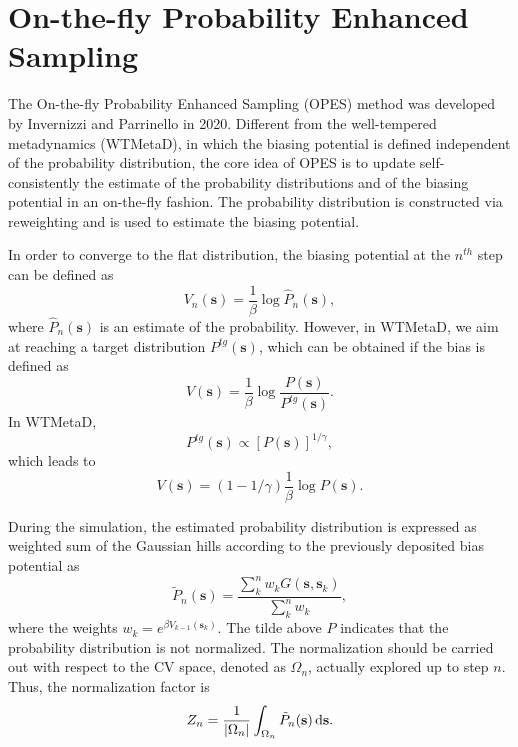 \section{On-the-fly Probability Enhanced Sampling\label{Sec:ES:OPES}}
The On-the-fly Probability Enhanced Sampling (OPES) method was developed by Invernizzi and Parrinello in 2020.\cite{InvernizziJPCL2020} Different from the well-tempered metadynamics (WTMetaD), in which the biasing potential is defined independent of the probability distribution, the core idea of OPES is to update self-consistently the estimate of the probability distributions and of the biasing potential in an on-the-fly fashion. The probability distribution is constructed via reweighting and is used to estimate the biasing potential.

In order to converge to the flat distribution, the biasing potential at the $n^{th}$ step can be defined as
\begin{equation}
	V_n(\mathbf{s})=\frac{1}{\beta} \log{\hat{P}_n(\mathbf{s})},
\end{equation}
where $\hat{P}_n(\mathbf{s})$ is an estimate of the probability. However, in WTMetaD, we aim at reaching a target distribution $P^{tg}(\mathbf{s})$, which can be obtained if the bias is defined as
\begin{equation}
	V(\mathbf{s})=\frac{1}{\beta} \log{\frac{P(\mathbf{s})}{P^{tg}(\mathbf{s})}}.
\end{equation}
In WTMetaD,
\begin{equation}
	P^{tg}(\mathbf{s})\propto \left[P(\mathbf{s})\right]^{1/\gamma},
\end{equation}
which leads to
\begin{equation}
	V(\mathbf{s})=(1-1/\gamma)\frac{1}{\beta} \log{P(\mathbf{s})}.
\end{equation}

During the simulation, the estimated probability distribution is expressed as weighted sum of the Gaussian hills according to the previously deposited bias potential as
\begin{equation}
	\tilde{P}_n(\mathbf{s})=\frac{\sum_k^n w_k G(\mathbf{s},\mathbf{s}_k)}{\sum_k^n w_k},
\end{equation}
where the weights $w_k=e^{\beta V_{k-1}(\mathbf{s}_k)}$. The tilde above $P$ indicates that the probability distribution is not normalized. The normalization should be carried out with respect to the CV space, denoted as $\Omega_n$, actually explored up to step $n$. Thus, the normalization factor is
\begin{equation}
	Z_n=\frac{1}{|\Omega_n|}\int_{\Omega_n}\tilde{P}_n(\mathbf{s})\mathop{}\!\mathrm{d} \mathbf{s}.
\end{equation}

